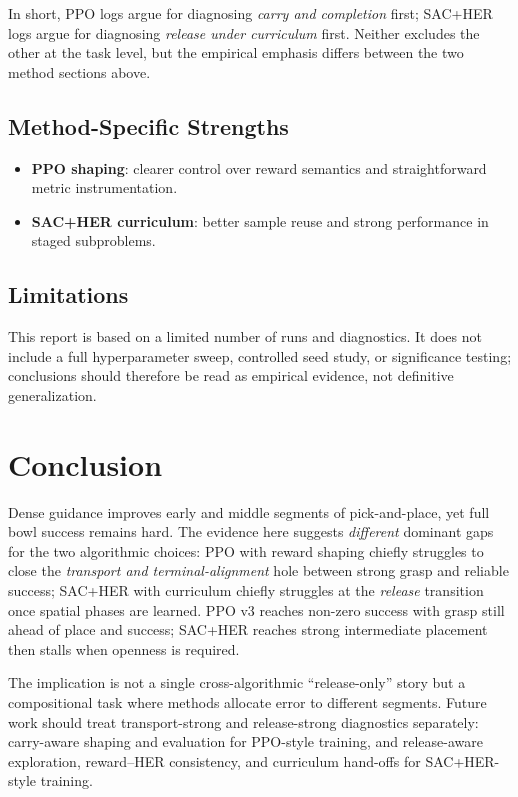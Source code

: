 \documentclass[11pt,a4paper]{article}
\begin{document}
\noindent In short, PPO logs argue for diagnosing \emph{carry and completion} first; SAC+HER logs argue for diagnosing \emph{release under curriculum} first. Neither excludes the other at the task level, but the empirical emphasis differs between the two method sections above.

\subsection{Method-Specific Strengths}
\begin{itemize}
    \item \textbf{PPO shaping}: clearer control over reward semantics and straightforward metric instrumentation.
    \item \textbf{SAC+HER curriculum}: better sample reuse and strong performance in staged subproblems.
\end{itemize}

\subsection{Limitations}
This report is based on a limited number of runs and diagnostics. It does not include a full hyperparameter sweep, controlled seed study, or significance testing; conclusions should therefore be read as empirical evidence, not definitive generalization.

\section{Conclusion}
Dense guidance improves early and middle segments of pick-and-place, yet full bowl success remains hard. The evidence here suggests \emph{different} dominant gaps for the two algorithmic choices: PPO with reward shaping chiefly struggles to close the \emph{transport and terminal-alignment} hole between strong grasp and reliable success; SAC+HER with curriculum chiefly struggles at the \emph{release} transition once spatial phases are learned. PPO v3 reaches non-zero success with grasp still ahead of place and success; SAC+HER reaches strong intermediate placement then stalls when openness is required.

The implication is not a single cross-algorithmic ``release-only'' story but a compositional task where methods allocate error to different segments. Future work should treat transport-strong and release-strong diagnostics separately: carry-aware shaping and evaluation for PPO-style training, and release-aware exploration, reward--HER consistency, and curriculum hand-offs for SAC+HER-style training.
\end{document}
